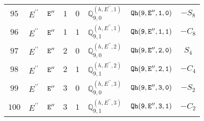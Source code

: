 \documentclass[fleqn,8pt]{jsarticle}
\begin{document}
\begin{table}[ht!]
\begin{center}
\begin{tabular}{cccccccc}
$ 95 $ & $ E^{\prime\prime} $ & $ {\tt E''} $ & $ 1 $ & $ 0 $ & $ \mathbb{Q}_{9,0}^{(h,E^{\prime\prime},1)} $ & $ {\tt Qh(9,E'',1,0)} $ & $ - S_{8} $ \\
$ 96 $ & $ E^{\prime\prime} $ & $ {\tt E''} $ & $ 1 $ & $ 1 $ & $ \mathbb{Q}_{9,1}^{(h,E^{\prime\prime},1)} $ & $ {\tt Qh(9,E'',1,1)} $ & $ - C_{8} $ \\
$ 97 $ & $ E^{\prime\prime} $ & $ {\tt E''} $ & $ 2 $ & $ 0 $ & $ \mathbb{Q}_{9,0}^{(h,E^{\prime\prime},2)} $ & $ {\tt Qh(9,E'',2,0)} $ & $ S_{4} $ \\
$ 98 $ & $ E^{\prime\prime} $ & $ {\tt E''} $ & $ 2 $ & $ 1 $ & $ \mathbb{Q}_{9,1}^{(h,E^{\prime\prime},2)} $ & $ {\tt Qh(9,E'',2,1)} $ & $ - C_{4} $ \\
$ 99 $ & $ E^{\prime\prime} $ & $ {\tt E''} $ & $ 3 $ & $ 0 $ & $ \mathbb{Q}_{9,0}^{(h,E^{\prime\prime},3)} $ & $ {\tt Qh(9,E'',3,0)} $ & $ - S_{2} $ \\
$ 100 $ & $ E^{\prime\prime} $ & $ {\tt E''} $ & $ 3 $ & $ 1 $ & $ \mathbb{Q}_{9,1}^{(h,E^{\prime\prime},3)} $ & $ {\tt Qh(9,E'',3,1)} $ & $ - C_{2} $ \\
 \hline \hline
\end{tabular}
\end{center}
\end{table}
\end{document}
